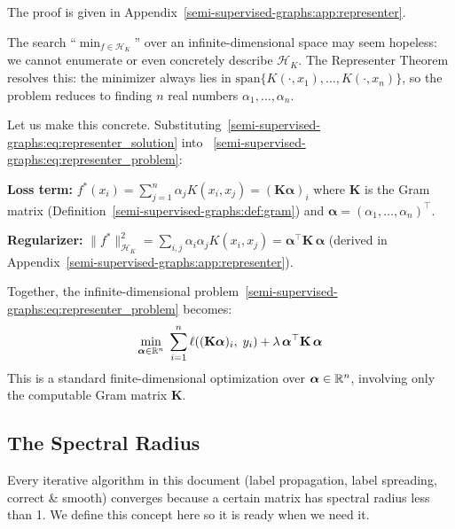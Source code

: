 \begin{notechapter}
The proof is given in Appendix~\ref{semi-supervised-graphs:app:representer}.

\begin{remark}
\label{semi-supervised-graphs:rem:rkhs_practical}
The search ``$\min_{f \in \mathcal{H}_K}$'' over an infinite-dimensional space
may seem hopeless: we cannot enumerate or even concretely describe
$\mathcal{H}_K$. The Representer Theorem resolves this: the minimizer always
lies in $\mathrm{span}\{K(\cdot, x_1), \ldots, K(\cdot, x_n)\}$, so the
problem reduces to finding $n$ real numbers $\alpha_1, \ldots, \alpha_n$.

Let us make this concrete. Substituting~\eqref{semi-supervised-graphs:eq:representer_solution} into
~\eqref{semi-supervised-graphs:eq:representer_problem}:

\textbf{Loss term:} $f^*(x_i) = \sum_{j=1}^n \alpha_j K(x_i, x_j)
= (\mathbf{K}\boldsymbol{\alpha})_i$ where $\mathbf{K}$ is the Gram matrix
(Definition~\ref{semi-supervised-graphs:def:gram}) and $\boldsymbol{\alpha}
= (\alpha_1, \ldots, \alpha_n)^\top$.

\textbf{Regularizer:} $\|f^*\|_{\mathcal{H}_K}^2
= \sum_{i,j}\alpha_i\alpha_j K(x_i, x_j)
= \boldsymbol{\alpha}^\top \mathbf{K}\,\boldsymbol{\alpha}$
(derived in Appendix~\ref{semi-supervised-graphs:app:representer}).

Together, the infinite-dimensional problem~\eqref{semi-supervised-graphs:eq:representer_problem}
becomes:
\begin{equation}
\label{semi-supervised-graphs:eq:kernelized_problem}
\min_{\boldsymbol{\alpha} \in \mathbb{R}^n}\;
\sum_{i=1}^n \ell\!\left((\mathbf{K}\boldsymbol{\alpha})_i,\; y_i\right) +
\lambda\, \boldsymbol{\alpha}^\top \mathbf{K}\, \boldsymbol{\alpha}
\end{equation}
This is a standard finite-dimensional optimization over
$\boldsymbol{\alpha} \in \mathbb{R}^n$, involving only the computable Gram matrix
$\mathbf{K}$.
\end{remark}

\subsection{The Spectral Radius}
\label{semi-supervised-graphs:subsec:spectral_radius}

Every iterative algorithm in this document (label propagation, label spreading,
correct \& smooth) converges because a certain matrix has spectral radius less
than 1. We define this concept here so it is ready when we need it.


\end{notechapter}
